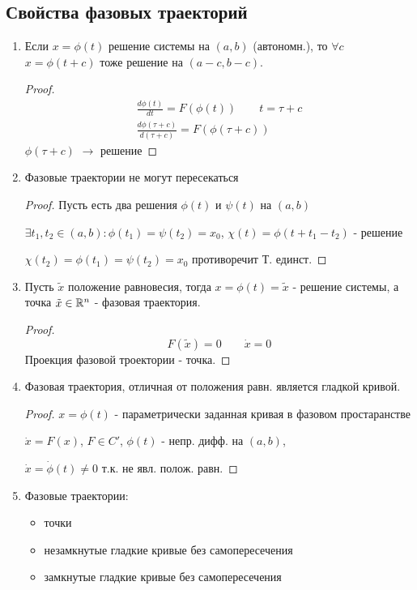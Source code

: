 \documentclass{article}
\begin{document}
\subsection{Свойства фазовых траекторий}
\begin{enumerate}
  \item Если $x=\phi(t)$ решение системы на $(a,b)$ (автономн.),
    то $\forall c$ $x=\phi(t+c)$ тоже решение на $(a-c,b-c)$.
    \begin{proof}
      \begin{gather*}
        \frac{d\phi(t)}{dt}=F(\phi(t)) \qquad t= \tau+c \\ 
        \frac{d\phi(\tau+c)}{d(\tau+c)}=F(\phi(\tau+c))
      \end{gather*}
      $\phi(\tau+c)$ $\rightarrow$ решение
    \end{proof}
  \item Фазовые траектории не могут пересекаться
    \begin{proof}
      Пусть есть два решения $\phi(t)$ и $\psi(t)$ на $(a,b)$
      
      \hbox{}
      $\exists t_1,t_2\in (a,b): \phi(t_1)=\psi(t_2)=x_0$,
      $\chi(t)=\phi(t+t_1-t_2)$ - решение 

      $\chi(t_2)=\phi(t_1)=\psi(t_2)=x_0$ противоречит Т. единст.
    \end{proof}
  \item Пусть $\tilde{x}$ положение равновесия, тогда $x=\phi(t)=\tilde{x}$
    - решение системы, а точка $\tilde{x}\in \mathbb{R}^{n}$ - фазовая траектория. 
    \begin{proof}
      \[
        F(\tilde{x})=0 \qquad \dot{x}=0
      \]
      Проекция фазовой троектории - точка.
    \end{proof}
  \item Фазовая траектория, отличная от положения равн. является гладкой кривой.
    \begin{proof}
      $x=\phi(t)$ - параметрически заданная кривая в фазовом простаранстве

      $\dot{x}=F(x)$, $F\in C'$, $\phi(t)$ - непр. дифф. на $(a,b)$,

      $\dot{x}=\dot{\phi}(t)\neq 0$ т.к. не явл. полож. равн.
    \end{proof}
  \item Фазовые траектории:
    \begin{itemize}
      \item точки
      \item незамкнутые гладкие кривые без самопересечения
      \item замкнутые гладкие кривые без самопересечения
    \end{itemize}
\end{enumerate}
\end{document}
